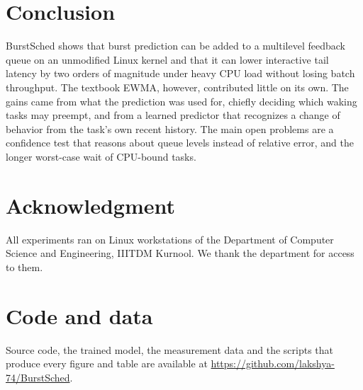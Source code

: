 \documentclass[conference]{IEEEtran}
\begin{document}
\section{Conclusion}\label{sec:conclusion}

BurstSched shows that burst prediction can be added to a multilevel feedback queue on an
unmodified Linux kernel and that it can lower interactive tail latency by two orders of
magnitude under heavy CPU load without losing batch throughput. The textbook EWMA, however,
contributed little on its own. The gains came from what the prediction was used for, chiefly
deciding which waking tasks may preempt, and from a learned predictor that recognizes a change of
behavior from the task's own recent history. The main open problems are a confidence test that
reasons about queue levels instead of relative error, and the longer worst-case wait of
CPU-bound tasks.

\section*{Acknowledgment}

All experiments ran on Linux workstations of the Department of Computer Science and
Engineering, IIITDM Kurnool. We thank the department for access to them.

\section*{Code and data}

Source code, the trained model, the measurement data and the scripts that produce every figure
and table are available at \url{https://github.com/lakshya-74/BurstSched}.
\end{document}
